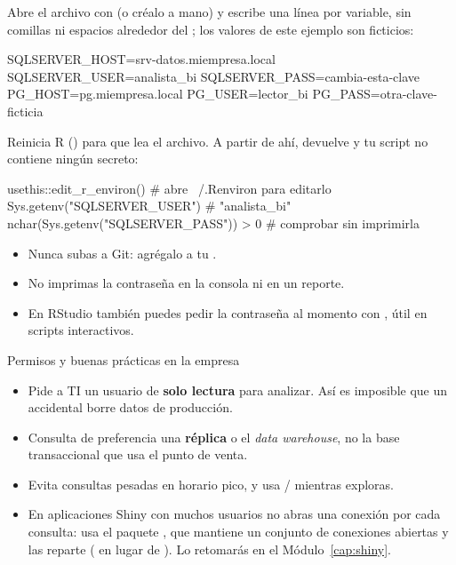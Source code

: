 Abre el archivo con  (o créalo a mano)
y escribe una línea por variable, sin comillas ni espacios alrededor del
\codigo{=}; los valores de este ejemplo son ficticios:

\begin{textocodigo}[title=Archivo .Renviron (ejemplo ficticio)]
SQLSERVER_HOST=srv-datos.miempresa.local
SQLSERVER_USER=analista_bi
SQLSERVER_PASS=cambia-esta-clave
PG_HOST=pg.miempresa.local
PG_USER=lector_bi
PG_PASS=otra-clave-ficticia
\end{textocodigo}

{\sloppy Reinicia R () para que lea el archivo. A partir de
ahí,  devuelve
 y tu script no contiene ningún secreto:\par}

\begin{rnoejecutar}
usethis::edit_r_environ()          # abre ~/.Renviron para editarlo
Sys.getenv("SQLSERVER_USER")       # "analista_bi"
nchar(Sys.getenv("SQLSERVER_PASS")) > 0   # comprobar sin imprimirla
\end{rnoejecutar}

\begin{advertencia}
\begin{itemize}
  \item Nunca subas  a Git: agrégalo a tu
        .
  \item No imprimas la contraseña en la consola ni en un reporte.
  \item En RStudio también puedes pedir la contraseña al momento con
        , útil en scripts
        interactivos.
\end{itemize}
\end{advertencia}

\begin{negocio}{Permisos y buenas prácticas en la empresa}
\begin{itemize}
  \item Pide a TI un usuario de \textbf{solo lectura} para analizar. Así es
        imposible que un  accidental borre datos de
        producción.
  \item Consulta de preferencia una \textbf{réplica} o el \emph{data
        warehouse}, no la base transaccional que usa el punto de venta.
  \item Evita consultas pesadas en horario pico, y usa /
         mientras exploras.
  \item En aplicaciones Shiny con muchos usuarios no abras una conexión por
        cada consulta: usa el paquete , que mantiene un
        conjunto de conexiones abiertas y las reparte
        ( en lugar de ). Lo
        retomarás en el Módulo~\ref{cap:shiny}.
\end{itemize}
\end{negocio}


